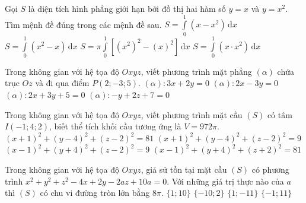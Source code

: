 \begin{ex}%
Gọi $S$ là diện tích hình phẳng giới hạn bởi đồ thị hai hàm số $y=x$ và $y=x^2$. Tìm mệnh đề đúng trong các mệnh đề sau.
\choice
{\True $S=\displaystyle\int\limits_{0}^{1} (x-x^2)\mathrm{\,d}x $}
{$S=\displaystyle\int\limits_{0}^{1} (x^2-x)\mathrm{\,d}x $}
{$S=\pi\displaystyle\int\limits_{0}^{1} \left[(x^2)^2-(x)^2\right]\mathrm{\,d}x $}
{$S=\displaystyle\int\limits_{0}^{1} (x\cdot x^2)\mathrm{\,d}x $}
\end{ex}

\begin{ex}%
Trong không gian với hệ tọa độ $Oxyz$, viết phương trình mặt phẳng $(\alpha)$ chứa trục $Oz$ và đi qua điểm $P(2;-3;5)$.
\choice
{\True $(\alpha)\colon 3x+2y=0$}
{$(\alpha)\colon 2x-3y=0$}
{$(\alpha)\colon 2x+3y+5=0$}
{$(\alpha)\colon -y+2z+7=0$}
\end{ex}

\begin{ex}%
Trong không gian với hệ tọa độ $Oxyz$, viết phương trình mặt cầu $(S)$ có tâm $I(-1;4;2)$, biết thể tích khối cầu tương ứng là $V=972\pi$.
\choice
{\True $(x+1)^2+(y-4)^2+(z-2)^2=81$}
{$(x+1)^2+(y-4)^2+(z-2)^2=9$}
{$(x-1)^2+(y+4)^2+(z-2)^2=9$}
{$(x-1)^2+(y+4)^2+(z+2)^2=81$}
\end{ex}

\begin{ex}%
Trong không gian với hệ tọa độ $Oxyz$, giả sử tồn tại mặt cầu $(S)$ có phương trình $x^2+y^2+z^2-4x+2y-2az+10a=0$. Với những giá trị thực nào của $a$ thì $(S)$ có chu vi đường tròn lớn bằng $8\pi$.
\choice
{$\{1;10\}$}
{$\{-10;2\}$}
{$\{1;-11\}$}
{\True $\{-1;11\}$}
\end{ex}

